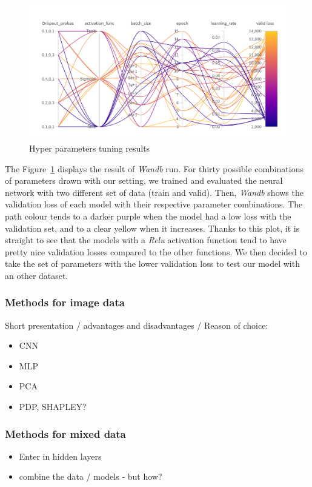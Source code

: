 \documentclass[12pt]{article}
\begin{document}
\FloatBarrier
\begin{figure}[ht]
    \centering
    \includegraphics[width=1\textwidth]{wandbrun_1.png}
    \caption{Hyper parameters tuning results}
    \label{table:Hyper parameters tuning results MLP}
\end{figure}
\FloatBarrier

\noindent The Figure~\ref{table:Hyper parameters tuning results MLP} displays the result of \textit{Wandb} run. For thirty possible combinations of parameters drawn with our setting, we trained and evaluated the neural network with two different set of data (train and valid). Then, \textit{Wandb} shows the validation loss of each model with their respective parameter combinations. The path colour tends to a darker purple when the model had a low loss with the validation set, and to a clear yellow when it increases.
Thanks to this plot, it is straight to see that the models with a \textit{Relu} activation function tend to have pretty nice validation losses compared to the other functions.
We then decided to take the set of parameters with the lower validation loss to test our model with an other dataset. 

\subsubsection{Methods for image data}
Short presentation / advantages and disadvantages / Reason of choice:
\begin{itemize}
    \item CNN
    \item MLP
     \item PCA 
    \item PDP, SHAPLEY?
\end{itemize}

\subsubsection{Methods for mixed data}
\begin{itemize}
    \item Enter in hidden layers
    \item combine the data / models - but how?
\end{itemize}
\end{document}
